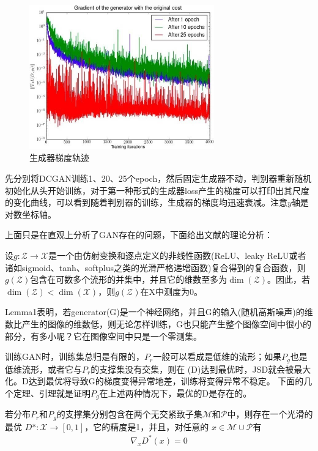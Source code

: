                 \begin{figure}[H]
                \centering
                \includegraphics[width=8cm]{images/Generator_gradient_trajectory.jpg}
                \caption{生成器梯度轨迹}
                \label{fig:生成器梯度轨迹}
                \end{figure}
            先分别将DCGAN训练1、20、25个epoch，然后固定生成器不动，判别器重新随机初始化从头开始训练，对于第一种形式的生成器loss产生的梯度可以打印出其尺度的变化曲线，可以看到随着判别器的训练，生成器的梯度均迅速衰减。注意$y$轴是对数坐标轴。
            \par
            上面只是在直观上分析了GAN存在的问题，下面给出文献\cite{2017.Arjovsky}的理论分析：
            \begin{lemma}[Lemma1 ]
            设$g:\mathcal{Z}\to \mathcal{X}$是一个由仿射变换和逐点定义的非线性函数(ReLU、leaky ReLU或者诸如sigmoid、tanh、softplus之类的光滑严格递增函数)复合得到的复合函数，则$g(\mathcal{Z})$包含在可数多个流形的并集中，并且它的维数至多为$\dim(\mathcal{Z})$。因此，若$\dim(\mathcal{Z}) < \dim(\mathcal{X})$，则$g(\mathcal{Z})$在X中测度为0。
            \end{lemma}
            \par
            Lemma1表明，若generator(G)是一个神经网络，并且G的输入(随机高斯噪声)的维数比产生的图像的维数低，则无论怎样训练，G也只能产生整个图像空间中很小的部分，有多小呢？它在图像空间中只是一个零测集。
            \par
            训练GAN时，训练集总归是有限的，$P_r$一般可以看成是低维的流形；如果$P_g$也是低维流形，或者它与$P_r$的支撑集没有交集，则在 (D)达到最优时，JSD就会被最大化。D达到最优将导致G的梯度变得异常地差，训练将变得异常不稳定。
            下面的几个定理、引理就是证明$P_g$在上述两种情况下，最优的D是存在的。
            \begin{theorem}[Theorem2.1]
            若分布$P_r$和$P_g$的支撑集分别包含在两个无交紧致子集$\mathcal{M}$和$\mathcal{P}$中，则存在一个光滑的最优 $D*: \mathcal{X} \to [0,1]$，它的精度是1，并且，对任意的
            $x\in \mathcal{M} \cup \mathcal{P}$有
            \begin{align*}
            \nabla _x D^*(x) = 0
            \end{align*}
            \end{theorem}
